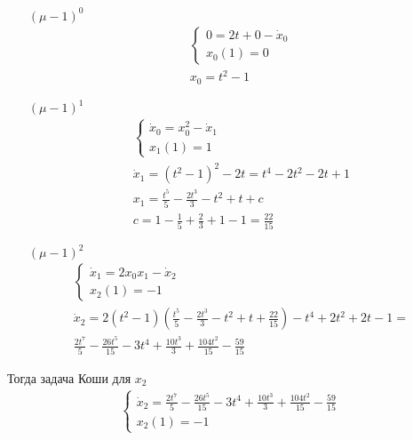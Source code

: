 	\begin{enumerate}
	\item[$(\mu - 1)^0$] 
		\begin{gather*}
		\begin{cases}
		0 = 2t + 0 - \dot{x}_0\\
		x_0(1) = 0
		\end{cases}\\
		x_0 = t^2 - 1
		\end{gather*}
	\item[$(\mu - 1)^1$] 
		\begin{gather*}
		\begin{cases}
		\dot{x}_0 = x_0^2 - \dot{x}_1\\
		x_1(1) = 1
		\end{cases}\\
		\dot{x}_1 = (t^2 - 1)^2 - 2t = t^4 - 2t^2 - 2t + 1\\
		x_1 = \frac{t^5}{5} - \frac{2t^3}{3} - t^2 + t + c\\
		c = 1 - \frac{1}{5} + \frac{2}{3} + 1 - 1 = \frac{22}{15}
		\end{gather*}
	\item[$(\mu - 1)^2$]
		\begin{gather*}
		\begin{cases}
		\dot{x}_1 = 2x_0 x_1 - \dot{x}_2\\
		x_2(1) = -1
		\end{cases}\\
		\dot{x}_2 = 2(t^2-1)\left( \frac{t^5}{5} - \frac{2t^3}{3} - t^2 + t + \frac{22}{15} \right) - t^4 + 2t^2 + 2t - 1=\\
		\frac{2t^7}{5} - \frac{26t^5}{15} - 3t^4 + \frac{10t^3}{3} + \frac{104t^2}{15} - \frac{59}{15}
		\end{gather*}
	\end{enumerate}
	Тогда задача Коши для $x_2$
	\begin{gather*}
	\begin{cases}
	\dot{x}_2 = \frac{2t^7}{5} - \frac{26t^5}{15} - 3t^4 + \frac{10t^3}{3} + \frac{104t^2}{15} - \frac{59}{15}\\
	x_2(1) = -1
	\end{cases}
	\end{gather*}
\vskip 0.4in


